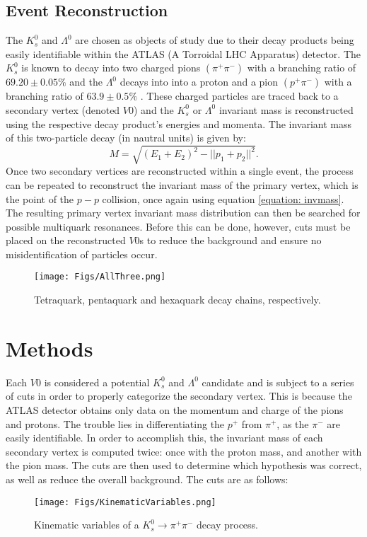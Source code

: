 \documentclass{article}
\begin{document}
\subsection{Event Reconstruction}
The $K^0_s$ and $\Lambda^0$ are chosen as objects of study due to their decay
products being easily identifiable within the ATLAS (A Torroidal LHC Apparatus) 
detector. The $K^0_s$ is
known to decay into two charged pions $(\pi^+\pi^-)$ with a branching ratio of
$69.20 \pm 0.05 \unit{\%}$ \cite{KBranchingRatio} and the $\Lambda^0$ decays
into into a proton and a pion $(p^+\pi^-)$ with a branching ratio of $63.9 \pm
0.5 \unit{\%}$ \cite{LBranchingRatio}. These charged particles are traced back to 
a secondary vertex (denoted $V0$) and the $K^0_s$ or $\Lambda^0$ invariant mass is reconstructed using the
respective decay product's energies and momenta.
The invariant mass of this two-particle 
decay (in nautral units) is given by:
\begin{equation}
M = \sqrt{(E_1 + E_2)^2 - ||p_1 + p_2||^2}.\label{equation: invmass} 
\end{equation}
Once two secondary vertices are reconstructed within a single event, the process 
can be repeated to reconstruct the invariant mass of the primary vertex, which is the point 
of the $p-p$ collision, once again using 
equation \ref{equation: invmass}. The resulting primary vertex invariant mass distribution can then be 
searched for possible multiquark resonances.
Before this can be done, however, cuts must be placed on the reconstructed $V0$s
to reduce the background and ensure no misidentification of particles occur.
\begin{figure}[!h]
\texttt{[image: Figs/AllThree.png]} 
\caption{Tetraquark, pentaquark and hexaquark decay chains, respectively.}
\end{figure}

\section{Methods}
Each $V0$ is considered a potential $K^0_s$ and $\Lambda^0$ candidate and is subject 
to a series of cuts in order to properly categorize the secondary vertex. This is because 
the ATLAS detector obtains only data on the momentum and charge of the pions and protons.
The trouble lies in differentiating the $p^+$ from $\pi^+$, as the  $\pi^-$ are easily 
identifiable. In order to accomplish this, the invariant mass of each secondary vertex 
is computed twice: once with the proton mass, and another with the pion mass. The cuts are 
then used to determine which hypothesis was correct, as well as reduce the overall background.
The cuts are as follows:\\
\vspace{-24pt}
\begin{wrapfigure}[13]{l}{0.40\textwidth}
  \texttt{[image: Figs/KinematicVariables.png]}
  \caption{\small Kinematic variables of a $K^0_s \rightarrow \pi^+\pi^-$ decay process.}\label{figure: KinematicVariables}
\end{wrapfigure}
\end{document}
